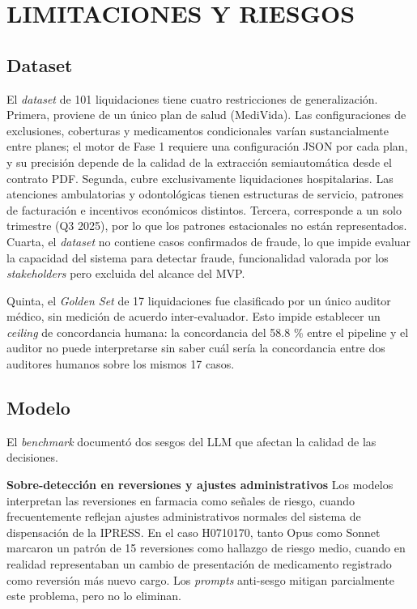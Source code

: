 \chapter{LIMITACIONES Y RIESGOS}

\section{Dataset}

El \textit{dataset}  de 101 liquidaciones tiene cuatro restricciones de generalización. Primera, proviene de un único plan de salud (MediVida). Las configuraciones de exclusiones, coberturas y medicamentos condicionales varían sustancialmente entre planes; el motor de Fase 1 requiere una configuración JSON por cada plan, y su precisión depende de la calidad de la extracción semiautomática desde el contrato PDF. Segunda, cubre exclusivamente liquidaciones hospitalarias. Las atenciones ambulatorias y odontológicas tienen estructuras de servicio, patrones de facturación e incentivos económicos distintos. Tercera, corresponde a un solo trimestre (Q3 2025), por lo que los patrones estacionales no están representados. Cuarta, el \textit{dataset}  no contiene casos confirmados de fraude, lo que impide evaluar la capacidad del sistema para detectar fraude, funcionalidad valorada por los \textit{stakeholders} pero excluida del alcance del MVP.

Quinta, el \textit{Golden Set} de 17 liquidaciones fue clasificado por un único auditor médico, sin medición de acuerdo inter-evaluador. Esto impide establecer un \textit{ceiling} de concordancia humana: la concordancia del 58.8 \% entre el pipeline y el auditor no puede interpretarse sin saber cuál sería la concordancia entre dos auditores humanos sobre los mismos 17 casos.

\section{Modelo}

El \textit{benchmark} documentó dos sesgos del LLM que afectan la calidad de las decisiones.

\textbf{Sobre-detección en reversiones y ajustes administrativos} Los modelos interpretan las reversiones en farmacia como señales de riesgo, cuando frecuentemente reflejan ajustes administrativos normales del sistema de dispensación de la IPRESS. En el caso H0710170, tanto Opus como Sonnet marcaron un patrón de 15 reversiones como hallazgo de riesgo medio, cuando en realidad representaban un cambio de presentación de medicamento registrado como reversión más nuevo cargo. Los \textit{prompts} anti-sesgo mitigan parcialmente este problema, pero no lo eliminan.

